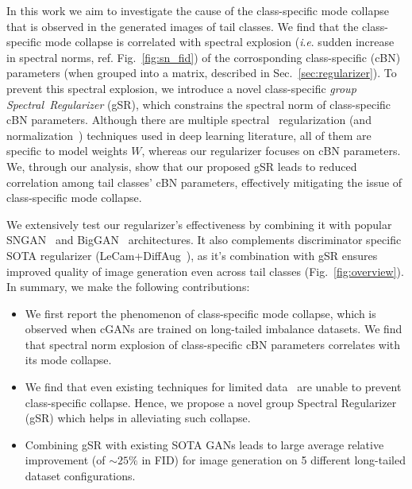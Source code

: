 \documentclass[runningheads,table]{llncs}
\newcommand{\ie}{\textit{i}.\textit{e}. }
\begin{document}
In this work we aim to investigate the cause of the class-specific mode collapse that is observed in the generated images of tail classes. We find that the class-specific mode collapse is correlated with spectral explosion (\ie sudden increase in spectral norms, ref. Fig.~\ref{fig:sn_fid}) of the corrosponding class-specific (cBN) parameters (when grouped into a matrix, described in Sec.~\ref{sec:regularizer}). To prevent this spectral explosion, we introduce a novel class-specific \textit{group \mbox{Spectral Regularizer}} (gSR), which constrains the spectral norm of class-specific cBN parameters. Although there are multiple spectral~\cite{yoshida2017spectral, vahdat2020NVAE} regularization (and normalization~\cite{miyato2018spectral}) techniques used in deep learning literature, all of them are specific to model weights $W$, whereas our regularizer focuses on cBN parameters. We, through our analysis, show that our proposed gSR leads to reduced correlation among tail classes' cBN parameters, effectively mitigating the issue of class-specific mode collapse. 

We extensively test our regularizer's effectiveness by combining it with popular SNGAN~\cite{miyato2018spectral} and BigGAN~\cite{brock2018large} architectures. It also complements discriminator specific SOTA regularizer (LeCam+DiffAug~\cite{tseng2021regularizing}), as it's combination with gSR ensures improved quality of image generation even across tail classes (Fig.~\ref{fig:overview}). In summary, we make the following contributions:
\begin{itemize}
\itemsep0em 
    \item We first report the phenomenon of class-specific mode collapse, which is observed when cGANs are trained on long-tailed imbalance datasets. We find that spectral norm explosion of class-specific cBN parameters correlates with its mode collapse.
    \item We find that even existing techniques for limited data~\cite{tseng2021regularizing, liu2021generative, Karras2020ada} are unable to prevent class-specific collapse. Hence, we propose a novel group Spectral Regularizer (gSR) which helps in alleviating such collapse.
    \item   Combining gSR with existing SOTA GANs leads to large average relative improvement (of $\sim25\%$ in FID) for image generation on 5 different long-tailed dataset configurations.
\end{itemize}
\end{document}
